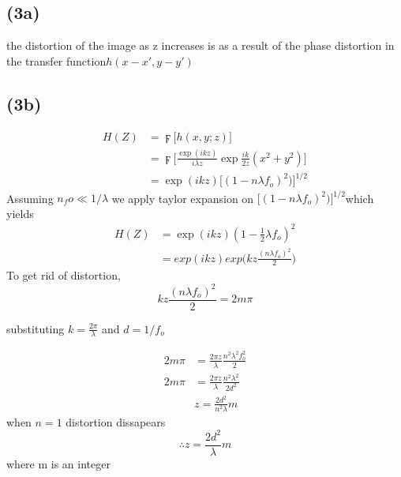\documentclass[24 pts]{article}
\begin{document}
\subsection{(3a)}
the distortion of the image as  z increases is as a result of the phase distortion in the transfer function$h(x-x',y-y')$

\subsection{(3b)}
\begin{equation}
\begin{split}
 H(Z)&=\digamma\big[ h(x,y;z)\big]\\
&=\digamma\big[\frac{ \exp(ikz)}{i\lambda z}\exp\frac{ik}{2z}(x^2+y^2)\big]\\
&=\exp(ikz)\big[(1-n\lambda f_o)^2)\big]^{1/2}
\end{split}
\end{equation}
Assuming $n_fo\ll1/\lambda$ we apply taylor expansion on $\big[(1-n\lambda f_o)^2)\big]^{1/2}$which yields
\begin{equation}
\begin{split}
H(Z)&=\exp(ikz)(1-\frac{1}{2}\lambda f_o)^2\\
&=exp(ikz)exp\big(kz\frac{(n\lambda f_o)^2}{2}\big)
\end{split}
\end{equation}
To get rid of distortion, $$ kz\frac{(n\lambda f_o)^2}{2}=2m\pi$$

substituting $k=\frac{2\pi}{\lambda}$ and $d=1/f_o$

\begin{equation}
\begin{split}
2m\pi &= \frac{2\pi z}{\lambda}\frac{n^2\lambda^2f_o^2}{2}\\
2m\pi &= \frac{2\pi z}{\lambda}\frac{n^2\lambda^2}{2d^2}\\
&z=\frac{2d^2}{n^2 \lambda}m
\end{split}
\end{equation}
when $n=1$ distortion dissapears 
\begin{equation}
\therefore z=\frac{2d^2}{\lambda}m
\end{equation}
where m is an integer
\end{document}
